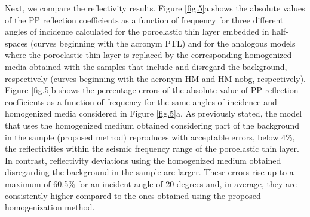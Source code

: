 \documentclass[draft]{agujournal2019}
\begin{document}
Next, we compare the reflectivity results. Figure \ref{fig.5}a shows the  absolute values of the PP reflection coefficients as a function of frequency for three different angles of incidence calculated for the poroelastic thin layer embedded in half-spaces (curves beginning with the acronym PTL) and for the analogous models where the poroelastic thin layer is replaced by the corresponding homogenized media obtained with the samples that include and disregard the background, respectively (curves beginning with the acronym HM and HM-nobg, respectively). Figure \ref{fig.5}b shows the percentage errors of the absolute value of PP reflection coefficients as a function of frequency for the same angles of incidence and homogenized media considered in Figure \ref{fig.5}a.  As previously stated, the model that uses the homogenized medium obtained considering part of the background in the sample (proposed method) reproduces with acceptable errors, below 4\%, the reflectivities  within the seismic frequency range of the poroelastic thin layer. In contrast, reflectivity deviations using the homogenized medium obtained disregarding the background in the sample are larger. These errors rise up to a maximum of 60.5\% for an incident angle of 20 degrees and, in average, they are consistently higher compared to the ones obtained using the proposed homogenization method.
\end{document}
